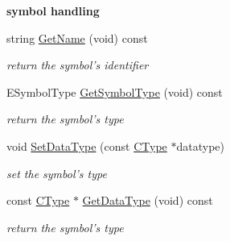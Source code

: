 \begin{Indent}{\bf symbol handling}\par
\begin{DoxyCompactItemize}
\item 
string \hyperlink{classCSymbol_abe8c7ca8a2203e1b6ed68226f773f107}{Get\-Name} (void) const 
\begin{DoxyCompactList}\small\item\em return the symbol's identifier \end{DoxyCompactList}\item 
E\-Symbol\-Type \hyperlink{classCSymbol_a11918e572759d1ff7a3924fec5579479}{Get\-Symbol\-Type} (void) const 
\begin{DoxyCompactList}\small\item\em return the symbol's type \end{DoxyCompactList}\item 
void \hyperlink{classCSymbol_a30148aa34e34a26dc4b70a55df18a3ff}{Set\-Data\-Type} (const \hyperlink{classCType}{C\-Type} $\ast$datatype)
\begin{DoxyCompactList}\small\item\em set the symbol's type \end{DoxyCompactList}\item 
const \hyperlink{classCType}{C\-Type} $\ast$ \hyperlink{classCSymbol_ad860bf3e84d48e9a3f848897c7320641}{Get\-Data\-Type} (void) const 
\begin{DoxyCompactList}\small\item\em return the symbol's type \end{DoxyCompactList}\end{DoxyCompactItemize}
\end{Indent}
